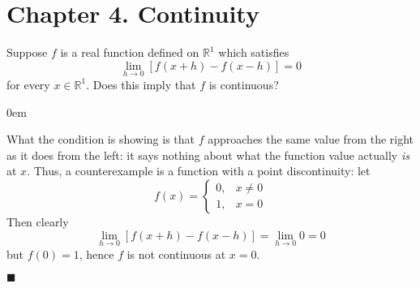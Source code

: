 \documentclass[12pt]{article}
\renewcommand{\qed}{\hfill$\blacksquare$}
\renewenvironment{proof}{\begin{addmargin}[1em]{0em}\begin{newproof}}{\end{newproof}\end{addmargin}\qed}
\newenvironment{problem}[2][Exercise]{\begin{trivlist}
\item[\hskip \labelsep {\bfseries #1}\hskip \labelsep {\bfseries #2.}]}{\end{trivlist}}
\begin{document}
\newpage
\section*{Chapter 4. Continuity}

\begin{problem}{4.1}
Suppose $f$ is a real function defined on $\mathbb{R}^1$ which satisfies $$ \lim_{h\rightarrow 0} \left[f\left(x+h\right)-f\left(x-h\right)\right] = 0 $$ for every $x\in \mathbb{R}^1$. Does this imply that $f$ is continuous?
\end{problem}
\begin{proof}
What the condition is showing is that $f$ approaches the same value from the right as it does from the left: it says nothing about what the function value actually \textit{is} at $x$. Thus, a counterexample is a function with a point discontinuity: let $$ f\left(x\right) = \left\{ \begin{array}{rl} 0, & x \neq 0 \\ 1, & x=0 \end{array} \right. $$ Then clearly $$ \lim_{h\rightarrow 0} \left[f\left(x+h\right)-f\left(x-h\right)\right] = \lim_{h\rightarrow 0} 0 = 0 $$ but $f\left(0\right) = 1$, hence $f$ is not continuous at $x=0$.
\end{proof}
\end{document}
